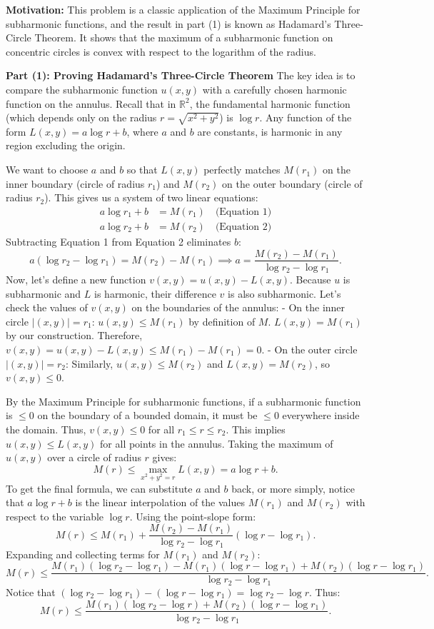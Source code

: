 \begin{solution}
\textbf{Motivation:} This problem is a classic application of the Maximum Principle for subharmonic functions, and the result in part (1) is known as Hadamard's Three-Circle Theorem. It shows that the maximum of a subharmonic function on concentric circles is convex with respect to the logarithm of the radius.

\textbf{Part (1): Proving Hadamard's Three-Circle Theorem}
The key idea is to compare the subharmonic function $u(x,y)$ with a carefully chosen harmonic function on the annulus.
Recall that in $\mathbb{R}^2$, the fundamental harmonic function (which depends only on the radius $r = \sqrt{x^2+y^2}$) is $\log r$. Any function of the form $L(x,y) = a \log r + b$, where $a$ and $b$ are constants, is harmonic in any region excluding the origin.

We want to choose $a$ and $b$ so that $L(x,y)$ perfectly matches $M(r_1)$ on the inner boundary (circle of radius $r_1$) and $M(r_2)$ on the outer boundary (circle of radius $r_2$).
This gives us a system of two linear equations:
\begin{align*}
a \log r_1 + b &= M(r_1) \quad \text{(Equation 1)} \\
a \log r_2 + b &= M(r_2) \quad \text{(Equation 2)}
\end{align*}
Subtracting Equation 1 from Equation 2 eliminates $b$:
\[
a(\log r_2 - \log r_1) = M(r_2) - M(r_1) \implies a = \frac{M(r_2) - M(r_1)}{\log r_2 - \log r_1}.
\]
Now, let's define a new function $v(x,y) = u(x,y) - L(x,y)$.
Because $u$ is subharmonic and $L$ is harmonic, their difference $v$ is also subharmonic.
Let's check the values of $v(x,y)$ on the boundaries of the annulus:
- On the inner circle $|(x,y)| = r_1$:
  $u(x,y) \leq M(r_1)$ by definition of $M$.
  $L(x,y) = M(r_1)$ by our construction.
  Therefore, $v(x,y) = u(x,y) - L(x,y) \leq M(r_1) - M(r_1) = 0$.
- On the outer circle $|(x,y)| = r_2$:
  Similarly, $u(x,y) \leq M(r_2)$ and $L(x,y) = M(r_2)$, so $v(x,y) \leq 0$.

By the Maximum Principle for subharmonic functions, if a subharmonic function is $\leq 0$ on the boundary of a bounded domain, it must be $\leq 0$ everywhere inside the domain. Thus, $v(x,y) \leq 0$ for all $r_1 \leq r \leq r_2$.
This implies $u(x,y) \leq L(x,y)$ for all points in the annulus. Taking the maximum of $u(x,y)$ over a circle of radius $r$ gives:
\[
M(r) \leq \max_{x^2+y^2=r} L(x,y) = a \log r + b.
\]
To get the final formula, we can substitute $a$ and $b$ back, or more simply, notice that $a \log r + b$ is the linear interpolation of the values $M(r_1)$ and $M(r_2)$ with respect to the variable $\log r$. Using the point-slope form:
\[
M(r) \leq M(r_1) + \frac{M(r_2) - M(r_1)}{\log r_2 - \log r_1} (\log r - \log r_1).
\]
Expanding and collecting terms for $M(r_1)$ and $M(r_2)$:
\[
M(r) \leq \frac{M(r_1)(\log r_2 - \log r_1) - M(r_1)(\log r - \log r_1) + M(r_2)(\log r - \log r_1)}{\log r_2 - \log r_1}.
\]
Notice that $(\log r_2 - \log r_1) - (\log r - \log r_1) = \log r_2 - \log r$. Thus:
\[
M(r) \leq \frac{M(r_1)(\log r_2 - \log r) + M(r_2)(\log r - \log r_1)}{\log r_2 - \log r_1}.
\]


\end{solution}
